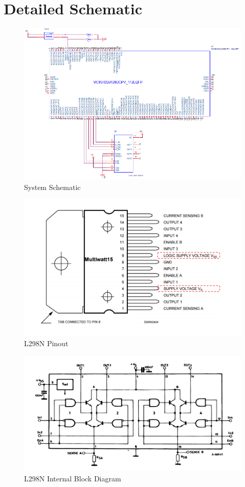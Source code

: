 \documentclass{article}
\begin{document}
	\section*{Detailed Schematic}
	\begin{figure}[H]
		\centering
		\includegraphics[width=1\textwidth]{Schematic}
		\caption{System Schematic}
	\end{figure}
	\begin{figure}[H]
		\centering
		\includegraphics[width=1\textwidth]{L298Pinout}
		\caption{L298N Pinout}
	\end{figure}
	\begin{figure}[H]
		\centering
		\includegraphics[width=1\textwidth]{L298BlockDiagram}
		\caption{L298N Internal Block Diagram}
	\end{figure}
\end{document}
